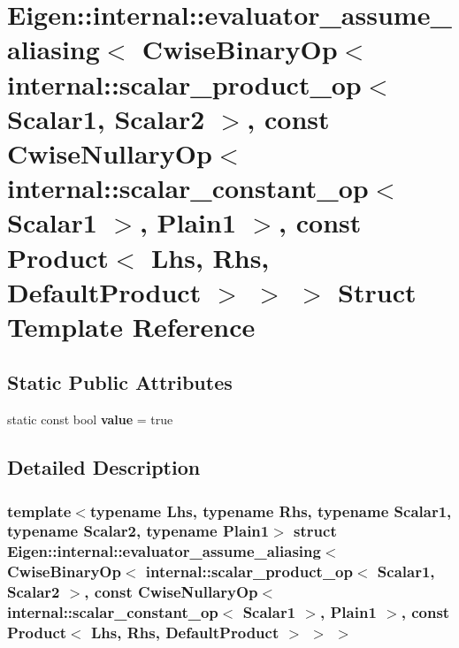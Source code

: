 \hypertarget{struct_eigen_1_1internal_1_1evaluator__assume__aliasing_3_01_cwise_binary_op_3_01internal_1_1scae866e2c7242096d7b5fd789e3b867e0a}{}\section{Eigen\+:\+:internal\+:\+:evaluator\+\_\+assume\+\_\+aliasing$<$ Cwise\+Binary\+Op$<$ internal\+:\+:scalar\+\_\+product\+\_\+op$<$ Scalar1, Scalar2 $>$, const Cwise\+Nullary\+Op$<$ internal\+:\+:scalar\+\_\+constant\+\_\+op$<$ Scalar1 $>$, Plain1 $>$, const Product$<$ Lhs, Rhs, Default\+Product $>$ $>$ $>$ Struct Template Reference}
\label{struct_eigen_1_1internal_1_1evaluator__assume__aliasing_3_01_cwise_binary_op_3_01internal_1_1scae866e2c7242096d7b5fd789e3b867e0a}
\subsection*{Static Public Attributes}
\begin{DoxyCompactItemize}
\item 
\mbox{\label{struct_eigen_1_1internal_1_1evaluator__assume__aliasing_3_01_cwise_binary_op_3_01internal_1_1scae866e2c7242096d7b5fd789e3b867e0a_a9a91f1db4e3d5c559a2090003c8abd48}} 
static const bool {\bfseries value} = true
\end{DoxyCompactItemize}


\subsection{Detailed Description}
\subsubsection*{template$<$typename Lhs, typename Rhs, typename Scalar1, typename Scalar2, typename Plain1$>$\newline
struct Eigen\+::internal\+::evaluator\+\_\+assume\+\_\+aliasing$<$ Cwise\+Binary\+Op$<$ internal\+::scalar\+\_\+product\+\_\+op$<$ Scalar1, Scalar2 $>$, const Cwise\+Nullary\+Op$<$ internal\+::scalar\+\_\+constant\+\_\+op$<$ Scalar1 $>$, Plain1 $>$, const Product$<$ Lhs, Rhs, Default\+Product $>$ $>$ $>$}



